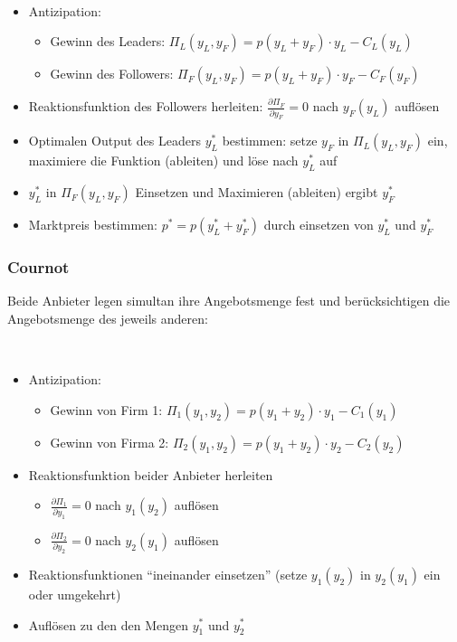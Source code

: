 \begin{kr}[Stackelberg] ~\
	\begin{itemize}
		\item Antizipation:
			\begin{itemize}
				\item Gewinn des Leaders: $\Pi_L(y_L, y_F) = p(y_L + y_F) \cdot y_L - C_L(y_L)$
				\item Gewinn des Followers: $\Pi_F(y_L, y_F) = p(y_L + y_F) \cdot y_F - C_F(y_F)$
			\end{itemize}
		\item Reaktionsfunktion des Followers herleiten: $\frac{\partial \Pi_F}{\partial y_F} = 0$ nach $y_F(y_L)$ auflösen
		\item Optimalen Output des Leaders $y_L^*$ bestimmen: setze $y_F$ in $\Pi_L(y_L, y_F)$ ein, maximiere die Funktion (ableiten) und löse nach $y_L^*$ auf
		\item $y_L^*$ in $\Pi_F(y_L, y_F)$ Einsetzen und Maximieren (ableiten) ergibt $y_F^*$
		\item Marktpreis bestimmen: $p^* = p(y_L^* + y_F^*)$ durch einsetzen von $y_L^*$ und $y_F^*$
	\end{itemize}
\end{kr}

\subsubsection*{Cournot}

Beide Anbieter legen simultan ihre Angebotsmenge fest und berücksichtigen die Angebotsmenge des jeweils anderen:

\begin{kr}[Cournot] ~\
	\begin{itemize}
		\item Antizipation:
			\begin{itemize}
				\item Gewinn von Firm 1: $\Pi_1(y_1, y_2) = p(y_1 + y_2) \cdot y_1 - C_1(y_1)$
				\item Gewinn von Firma 2: $\Pi_2(y_1, y_2) = p(y_1 + y_2) \cdot y_2 - C_2(y_2)$
			\end{itemize}
		\item Reaktionsfunktion beider Anbieter herleiten	
			\begin{itemize}
				\item $\frac{\partial \Pi_1}{\partial y_1} = 0$ nach $y_1(y_2)$ auflösen
				\item $\frac{\partial \Pi_2}{\partial y_2} = 0$ nach $y_2(y_1)$ auflösen
			\end{itemize}
		\item Reaktionsfunktionen \enquote{ineinander einsetzen} (setze $y_1(y_2)$ in $y_2(y_1)$ ein oder umgekehrt)
		\item Auflösen zu den den Mengen $y_1^*$ und $y_2^*$
	\end{itemize}
\end{kr}

